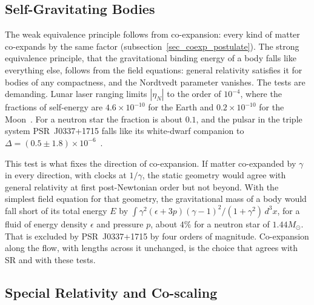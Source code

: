 \documentclass{iopjournal}
\begin{document}
\subsection{Self-Gravitating Bodies}\label{sec_sep}

The weak equivalence principle follows from co-expansion: every kind of matter co-expands by the same factor (subsection~\ref{sec_coexp_postulate}). The strong equivalence principle, that the gravitational binding energy of a body falls like everything else, follows from the field equations: general relativity satisfies it for bodies of any compactness, and the Nordtvedt parameter vanishes. The tests are demanding. Lunar laser ranging limits $|\eta_N|$ to the order of $10^{-4}$, where the fractions of self-energy are $4.6\times10^{-10}$ for the Earth and $0.2\times10^{-10}$ for the Moon~\cite{Will2014}. For a neutron star the fraction is about $0.1$, and the pulsar in the triple system PSR~J0337+1715 falls like its white-dwarf companion to $\Delta=(0.5\pm1.8)\times10^{-6}$~\cite{Voisin2020}.

This test is what fixes the direction of co-expansion. If matter co-expanded by $\gamma$ in every direction, with clocks at $1/\gamma$, the static geometry would agree with general relativity at first post-Newtonian order but not beyond. With the simplest field equation for that geometry, the gravitational mass of a body would fall short of its total energy $E$ by $\int\gamma^2(\epsilon+3p)(\gamma-1)^2/(1+\gamma^2)\,d^3x$, for a fluid of energy density $\epsilon$ and pressure $p$, about $4\%$ for a neutron star of $1.44M_\odot$. That is excluded by PSR~J0337+1715 by four orders of magnitude. Co-expansion along the flow, with lengths across it unchanged, is the choice that agrees with SR and with these tests.

\subsection{Special Relativity and Co-scaling}\label{sec_rms}
\end{document}
